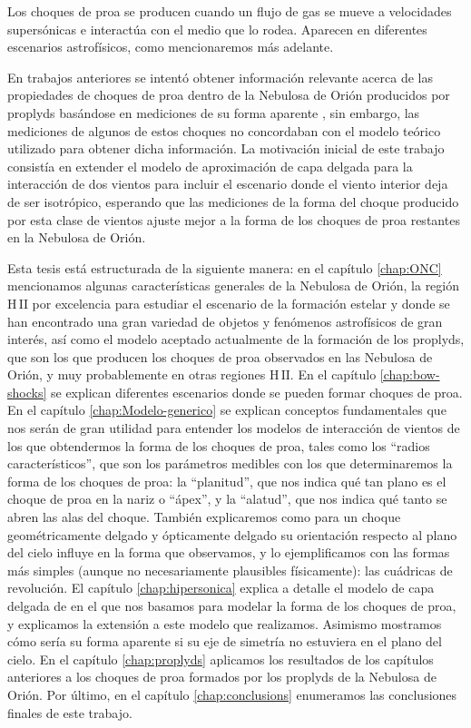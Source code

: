 \documentclass[11pt, twoside]{book}
\newcommand\Ion[2]{\ensuremath{\mathrm{#1\,\scriptstyle #2}}} %
\begin{document}
Los choques de proa se producen cuando un flujo de gas se mueve a velocidades supersónicas e interactúa con el medio que lo rodea. Aparecen en diferentes escenarios astrofísicos, como mencionaremos más adelante.

En trabajos anteriores se intentó obtener información relevante acerca de las propiedades de choques de proa dentro de la Nebulosa de Orión producidos por proplyds basándose en mediciones de su forma aparente \citep{Robberto:2005}, sin embargo, las mediciones de algunos de estos choques no concordaban con el modelo teórico utilizado para obtener dicha información. La motivación inicial de este trabajo consistía en extender el modelo de aproximación de capa delgada para la interacción de dos vientos \citep{Canto:1996} para incluir el escenario donde el viento interior deja de ser isotrópico, esperando que las mediciones de la forma del choque producido por esta clase de vientos ajuste mejor a la forma de los choques de proa restantes en la Nebulosa de Orión.

Esta tesis está estructurada de la siguiente manera: en el capítulo \ref{chap:ONC} mencionamos algunas características generales de la Nebulosa de Orión, la región \Ion{H}{II} por excelencia para estudiar el escenario de la formación estelar y donde se han encontrado una gran variedad de objetos y fenómenos astrofísicos de gran interés, así como el modelo aceptado actualmente de la formación de los proplyds, que son los que producen los choques de proa observados en las Nebulosa de Orión, y muy probablemente en otras regiones \Ion{H}{II}. En el capítulo \ref{chap:bow-shocks} se explican diferentes escenarios donde se pueden formar choques de proa. En el capítulo \ref{chap:Modelo-generico} se explican conceptos fundamentales que nos serán de gran utilidad para entender los modelos de interacción de vientos de los que obtendermos la forma de los choques de proa, tales como los ``radios característicos'', que son los parámetros medibles con los que determinaremos la forma de los choques de proa: la ``planitud'', que nos indica qué tan plano es el choque de proa en la nariz o ``ápex'', y la ``alatud'', que nos indica qué tanto se abren las alas del choque. También explicaremos como para un choque geométricamente delgado y ópticamente delgado su orientación respecto al plano del cielo influye en la forma que observamos, y lo ejemplificamos con las formas más simples (aunque no necesariamente plausibles físicamente): las cuádricas de revolución. El capítulo \ref{chap:hipersonica} explica a detalle el modelo de capa delgada de \citet{Canto:1996} en el que nos basamos para modelar la forma de los choques de proa, y explicamos la extensión a este modelo que realizamos. Asimismo mostramos cómo sería su forma aparente si su eje de simetría no estuviera en el plano del cielo. En el capítulo \ref{chap:proplyds} aplicamos los resultados de los capítulos anteriores a los choques de proa formados por los proplyds de la Nebulosa de Orión. Por último, en el capítulo \ref{chap:conclusions} enumeramos las conclusiones finales de este trabajo.
\end{document}
